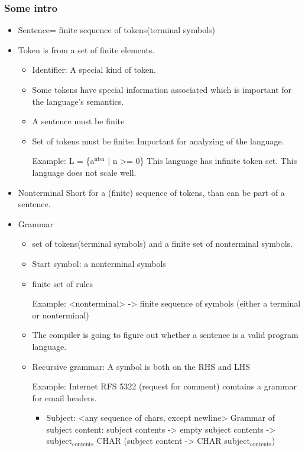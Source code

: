 \documentclass[11pt]{article}
\begin{document}
\subsubsection{Some intro}
\label{sec:org6812f68}
\begin{itemize}
\item Sentence= finite sequence of tokens(terminal symbols)

\item Token is from a set of finite elements.
\begin{itemize}
\item Identifier: A special kind of token.
\item Some tokens have special information associated which is important for the
language's semantics.
\item A sentence must be finite
\item Set of tokens must be finite: Important for analyzing of the language.

Example: L = \{a\(^{\text{nb}}\)\(^{\text{n}}\) | n >= 0\}
	 This language has infinite token set.
	 This language does not scale well.
\end{itemize}

\item Nonterminal
Short for a (finite) sequence of tokens, than can be part of a sentence.

\item Grammar
\begin{itemize}
\item set of tokens(terminal symbols) and a finite set of nonterminal symbols.

\item Start symbol: a nonterminal symbols

\item finite set of rules

Example: <nonterminal> -> finite sequence of symbols (either a terminal or
nonterminal)

\item The compiler is going to figure out whether a sentence is a valid program language.

\item Recursive grammar: A symbol is both on the RHS and LHS

Example: Internet RFS 5322 (request for comment)
comtains a grammar for email headers.
\begin{itemize}
\item Subject: <any sequence of chars, except newline>
Grammar of subject content:
      subject contents -> empty
      subject contents -> subject\(_{\text{contents}}\) CHAR
      (subject content -> CHAR subject\(_{\text{contents}}\))


\end{itemize}
\end{itemize}
\end{itemize}
\end{document}
